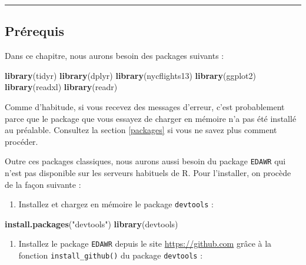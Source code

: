 \documentclass[a4paperpaper,]{article}
\newenvironment{Shaded}{\begin{snugshade}}{\end{snugshade}}
\newcommand{\KeywordTok}[1]{\textcolor[rgb]{0.13,0.29,0.53}{\textbf{#1}}}
\newcommand{\StringTok}[1]{\textcolor[rgb]{0.31,0.60,0.02}{#1}}
\newcommand{\NormalTok}[1]{#1}
\providecommand{\tightlist}{%
  \setlength{\itemsep}{0pt}\setlength{\parskip}{0pt}}
\theoremstyle{definition}
\theoremstyle{definition}
\theoremstyle{definition}
\theoremstyle{remark}
\begin{document}
\begin{center}\rule{0.5\linewidth}{\linethickness}\end{center}

\subsection{Prérequis}\label{prerek}

Dans ce chapitre, nous aurons besoin des packages suivants :

\begin{Shaded}
\begin{Highlighting}[]
\KeywordTok{library}\NormalTok{(tidyr)}
\KeywordTok{library}\NormalTok{(dplyr)}
\KeywordTok{library}\NormalTok{(nycflights13)}
\KeywordTok{library}\NormalTok{(ggplot2)}
\KeywordTok{library}\NormalTok{(readxl)}
\KeywordTok{library}\NormalTok{(readr)}
\end{Highlighting}
\end{Shaded}

Comme d'habitude, si vous recevez des messages d'erreur, c'est
probablement parce que le package que vous essayez de charger en mémoire
n'a pas été installé au préalable. Consultez la section \ref{packages}
si vous ne savez plus comment procéder.

Outre ces packages classiques, nous aurons aussi besoin du package
\texttt{EDAWR} qui n'est pas disponible sur les serveurs habituels de R.
Pour l'installer, on procède de la façon suivante :

\begin{enumerate}
\def\labelenumi{\arabic{enumi}.}
\tightlist
\item
  Installez et chargez en mémoire le package \texttt{devtools} :
\end{enumerate}

\begin{Shaded}
\begin{Highlighting}[]
\KeywordTok{install.packages}\NormalTok{(}\StringTok{"devtools"}\NormalTok{)}
\KeywordTok{library}\NormalTok{(devtools)}
\end{Highlighting}
\end{Shaded}

\begin{enumerate}
\def\labelenumi{\arabic{enumi}.}
\setcounter{enumi}{1}
\tightlist
\item
  Installez le package \texttt{EDAWR} depuis le site
  \url{https://github.com} grâce à la fonction
  \texttt{install\_github()} du package \texttt{devtools} :
\end{enumerate}
\end{document}
